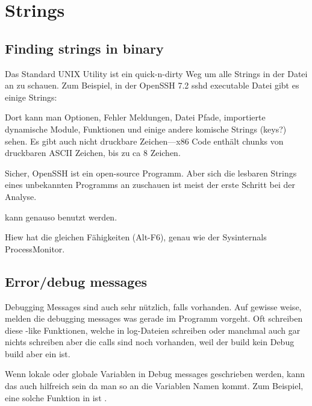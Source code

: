 \section{Strings}
\label{sec:digging_strings}



\subsection{Finding strings in binary}

Das Standard UNIX  Utility ist ein quick-n-dirty Weg um alle Strings in der 
Datei an zu schauen. Zum Beispiel, in der OpenSSH 7.2 sshd executable Datei gibt es einige Strings:



Dort kann man Optionen, Fehler Meldungen, Datei Pfade, importierte dynamische Module, Funktionen und einige andere komische 
Strings (keys?) sehen. Es gibt auch nicht druckbare Zeichen---x86 Code enthält chunks von druckbaren ASCII Zeichen, bis zu ca 8 Zeichen. %

Sicher, OpenSSH ist ein open-source Programm.
Aber sich die lesbaren Strings eines unbekannten Programms an zuschauen ist meist der erste Schritt bei 
der Analyse. 

 kann genauso benutzt werden.

Hiew hat die gleichen Fähigkeiten (Alt-F6), genau wie der Sysinternals ProcessMonitor.

\subsection{Error/debug messages}

Debugging Messages sind auch sehr nützlich, falls vorhanden.
Auf gewisse weise, melden die debugging messages was gerade
im Programm vorgeht. Oft schreiben diese \printf-like Funktionen, welche
in log-Dateien schreiben oder manchmal auch gar nichts schreiben aber die 
calls sind noch vorhanden, weil der build kein Debug build aber ein  ist. %
\myindex{\oracle}

Wenn lokale oder globale Variablen in Debug messages geschrieben werden, kann das auch 
hilfreich sein da man so an die Variablen Namen kommt. %
Zum Beispiel, eine solche Funktion in \oracle ist .

